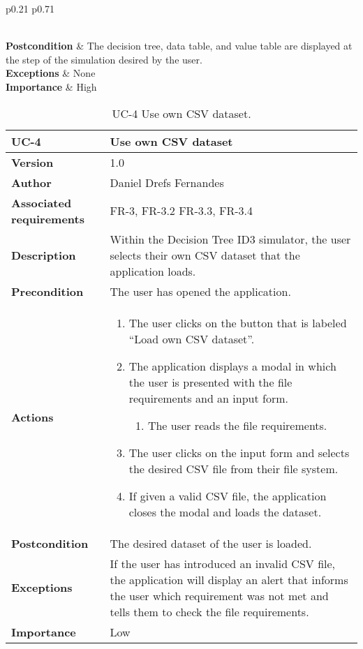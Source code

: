 \begin{table}[p]
\begin{tabularx}{\linewidth}{ p{0.21\columnwidth} p{0.71\columnwidth} }
\begin{enumerate}
		\end{enumerate}\\
		\textbf{Postcondition}        & The decision tree, data table, and value table are displayed at the step of the simulation desired by the user. \\
		\textbf{Exceptions}          & None \\
		\textbf{Importance}          & High \\
		\bottomrule
	\end{tabularx}
	\caption{UC-3 Run Decision Tree ID3 simulator.}
    \label{table:uc_3}
\end{table}

\begin{table}[p]
	\centering
	\begin{tabularx}{\linewidth}{ p{} p{} }
		\toprule
		\textbf{UC-4}    & \textbf{Use own CSV dataset}\\
		\toprule
		\textbf{Version}              & 1.0    \\
		\textbf{Author}                & Daniel Drefs Fernandes \\
		\textbf{Associated requirements} & FR-3, FR-3.2 FR-3.3, FR-3.4 \\
		\textbf{Description}          & Within the Decision Tree ID3 simulator, the user selects their own CSV dataset that the application loads. \\
		\textbf{Precondition}         & The user has opened the application. \\
		\textbf{Actions}             &
		\begin{enumerate}
			\def\labelenumi{\arabic{enumi}.}
			\tightlist
			\item The user clicks on the button that is labeled ``Load own CSV dataset''.
			\item The application displays a modal in which the user is presented with the file requirements and an input form.
            \begin{enumerate}
                \item The user reads the file requirements.
            \end{enumerate}
            \item The user clicks on the input form and selects the desired CSV file from their file system.
            \item If given a valid CSV file, the application closes the modal and loads the dataset.
		\end{enumerate}\\
		\textbf{Postcondition}        & The desired dataset of the user is loaded. \\
		\textbf{Exceptions}          & If the user has introduced an invalid CSV file, the application will display an alert that informs the user which requirement was not met and tells them to check the file requirements. \\
		\textbf{Importance}          & Low \\
		\bottomrule
	\end{tabularx}
	\caption{UC-4 Use own CSV dataset.}
    \label{table:uc_4}
\end{table}
